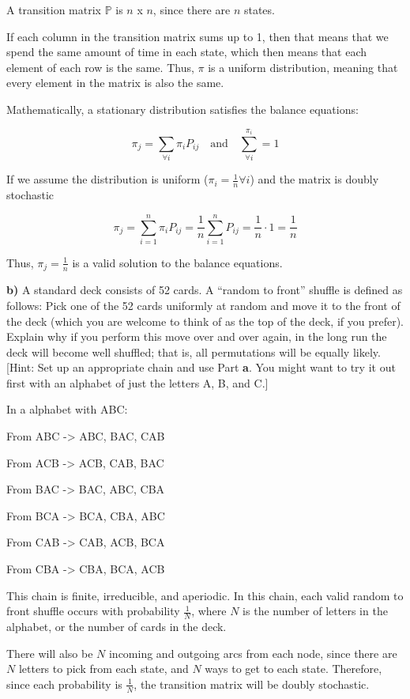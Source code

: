 \documentclass[11pt]{article}
\begin{document}
A transition matrix $ \mathbb{P} $ is $ n $ x $ n $, since there are $ n $ states. 

If each column in the transition matrix sums up to 1, then that means that we spend the same amount of time in each state, which then means that each element of each row is the same. Thus, $ \pi $ is a uniform distribution, meaning that every element in the matrix is also the same.  


Mathematically, a stationary distribution satisfies the balance equations:  

\[
\pi_{j} = \sum_{\forall i}^{} \pi_{i} P_{ij}\quad \text{and} \quad \sum_{\forall i}^{\pi_{i}} = 1
\]

If we assume the distribution is uniform ($ \pi_{i} = \frac{1}{n} \forall i $) 
and the matrix is doubly stochastic

\[
\pi_{j} = \sum_{i=1}^{n} \pi_{i}P_{ij} = \frac{1}{n}\sum_{i=1}^{n}P_{ij} = \frac{1}{n} \cdot 1  =  \frac{1}{n}
\]

Thus, $ \pi_{j} = \frac{1}{n} $ is a valid solution to the balance equations. 

\textbf{b)} A standard deck consists of 52 cards. A ``random to front''
shuffle is defined as follows: Pick one of the 52 cards uniformly at
random and move it to the front of the deck (which you are welcome to
think of as the top of the deck, if you prefer). Explain why if you
perform this move over and over again, in the long run the deck will
become well shuffled; that is, all permutations will be equally likely.
{[}Hint: Set up an appropriate chain and use Part \textbf{a}. You might
want to try it out first with an alphabet of just the letters A, B, and
C.{]}

In a alphabet with ABC: 

From ABC -> ABC, BAC, CAB

From ACB -> ACB, CAB, BAC

From BAC -> BAC, ABC, CBA

From BCA -> BCA, CBA, ABC

From CAB -> CAB, ACB, BCA

From CBA -> CBA, BCA, ACB

This chain is finite, irreducible, and aperiodic. In this chain, each valid random to front shuffle occurs with probability $ \frac{1}{N} $, where $ N $ is the number of letters in the alphabet, or the number of cards in the deck.

There will also be $ N$ incoming and outgoing arcs from each node, since there are $ N $ letters to pick from each state, and $ N $ ways to get to each state. Therefore, since each probability is $ \frac{1}{N} $, the transition matrix will be doubly stochastic. 
\end{document}
